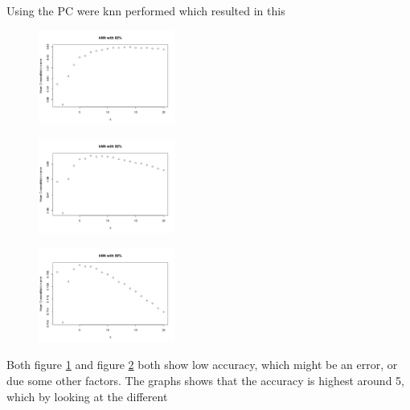 Using the PC were knn performed which resulted in this

\begin{figure}[H]
\centering
\includegraphics[width = 0.4\textwidth]{graphics/kNN_plot_80.png}
\label{fig:knnFit_80}
\end{figure}


\begin{figure}[H]
\centering
\includegraphics[width = 0.4\textwidth]{graphics/kNN_plot_90.png}
\label{fig:knnFit_90}
\end{figure}


\begin{figure}[H]
\centering
\includegraphics[width = 0.4\textwidth]{graphics/kNN_plot_99.png}
\label{fig:knnFit_99}
\end{figure}

Both figure \ref{fig:knnFit_80} and figure \ref{fig:knnFit_90} both show low accuracy,
which might be an error, or due some other factors. 
 The graphs shows that the accuracy is highest around 5, which by looking at the different




